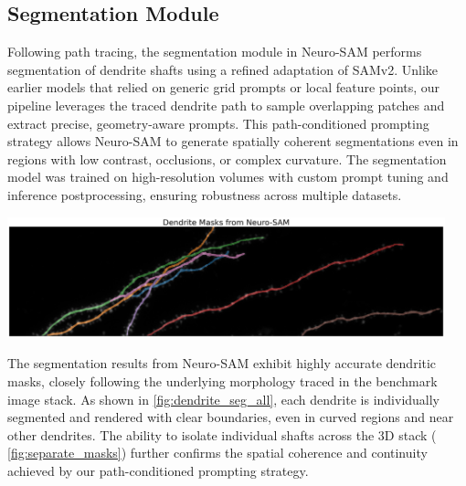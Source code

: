 \subsection{Segmentation Module}

Following path tracing, the segmentation module in Neuro-\gls{SAM} performs segmentation of dendrite shafts using a refined adaptation of \gls{SAMv2}. Unlike earlier models that relied on generic grid prompts or local feature points, our pipeline leverages the traced dendrite path to sample overlapping patches and extract precise, geometry-aware prompts. This path-conditioned prompting strategy allows Neuro-\gls{SAM} to generate spatially coherent segmentations even in regions with low contrast, occlusions, or complex curvature. The segmentation model was trained on high-resolution volumes with custom prompt tuning and inference postprocessing, ensuring robustness across multiple datasets.

\begin{center}
\includegraphics[width=0.95\textwidth]{figures/33_dendrite_seg_all.png}
\label{fig:dendrite_seg_all}
\end{center}

The segmentation results from Neuro-\gls{SAM} exhibit highly accurate dendritic masks, closely following the underlying morphology traced in the benchmark image stack. As shown in \autoref{fig:dendrite_seg_all}, each dendrite is individually segmented and rendered with clear boundaries, even in curved regions and near other dendrites. The ability to isolate individual shafts across the 3D stack ( \autoref{fig:separate_masks}) further confirms the spatial coherence and continuity achieved by our path-conditioned prompting strategy.

